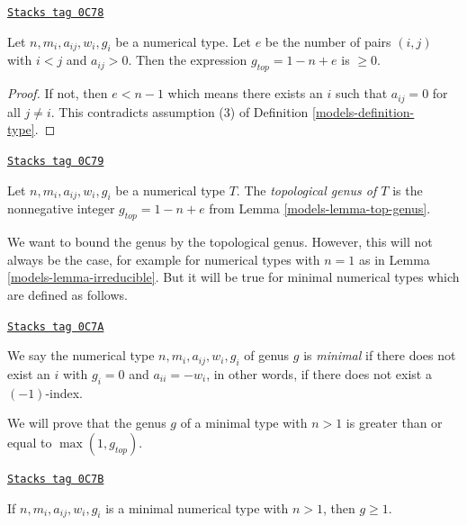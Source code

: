 \begin{lemma}
\label{models-lemma-top-genus}
\href{https://stacks.math.columbia.edu/tag/0C78}{\texttt{Stacks tag 0C78}}

Let $n, m_i, a_{ij}, w_i, g_i$ be a numerical type.
Let $e$ be the number of pairs $(i, j)$ with $i < j$ and $a_{ij} > 0$.
Then the expression $g_{top} = 1 - n + e$ is $\geq 0$.
\end{lemma}

\begin{proof}

If not, then $e < n - 1$ which means there exists an $i$ such that
$a_{ij} = 0$ for all $j \not = i$. This contradicts assumption
(3) of Definition \ref{models-definition-type}.
\end{proof}

\begin{definition}
\label{models-definition-top-genus}
\href{https://stacks.math.columbia.edu/tag/0C79}{\texttt{Stacks tag 0C79}}

Let $n, m_i, a_{ij}, w_i, g_i$ be a numerical type $T$. The
{\it topological genus of $T$} is the nonnegative integer
$g_{top} = 1 - n + e$ from Lemma \ref{models-lemma-top-genus}.
\end{definition}

We want to bound the genus by the topological genus. However, this
will not always be the case, for example for numerical types
with $n = 1$ as in Lemma \ref{models-lemma-irreducible}. But it will
be true for minimal numerical types which are defined as follows.

\begin{definition}
\label{models-definition-type-minimal}
\href{https://stacks.math.columbia.edu/tag/0C7A}{\texttt{Stacks tag 0C7A}}

We say the numerical type $n, m_i, a_{ij}, w_i, g_i$ of genus $g$
is {\it minimal} if there does not exist an $i$
with $g_i = 0$ and $a_{ii} = -w_i$, in other words, if there
does not exist a $(-1)$-index.
\end{definition}

We will prove that the genus $g$ of a minimal type with $n > 1$
is greater than or equal to $\max(1, g_{top})$.

\begin{lemma}
\label{models-lemma-non-irreducible-minimal-type-genus-at-least-one}
\href{https://stacks.math.columbia.edu/tag/0C7B}{\texttt{Stacks tag 0C7B}}

If $n, m_i, a_{ij}, w_i, g_i$ is a minimal numerical type
with $n > 1$, then $g \geq 1$.
\end{lemma}

